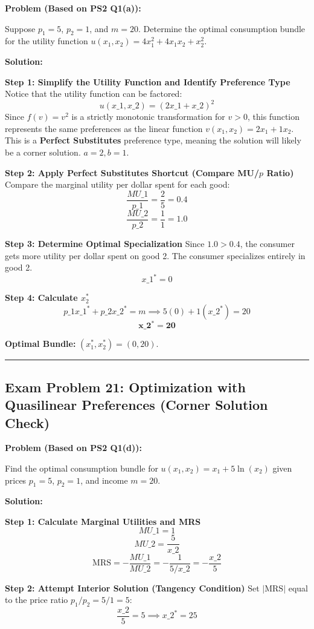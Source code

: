 \documentclass{article}
\begin{document}
\textbf{Problem (Based on PS2 Q1(a)):}

Suppose $p_1 = 5$, $p_2 = 1$, and $m = 20$. Determine the optimal consumption bundle for the utility function $u(x_1, x_2) = 4x_1^2 + 4x_1x_2 + x_2^2$.

\textbf{Solution:}

\textbf{Step 1: Simplify the Utility Function and Identify Preference Type}
Notice that the utility function can be factored:
\[ u(x\_1, x\_2) = (2x\_1 + x\_2)^2 \]
Since $f(v) = v^2$ is a strictly monotonic transformation for $v > 0$, this function represents the same preferences as the linear function $v(x_1, x_2) = 2x_1 + 1x_2$. This is a \textbf{Perfect Substitutes} preference type, meaning the solution will likely be a corner solution. $a=2, b=1$.

\textbf{Step 2: Apply Perfect Substitutes Shortcut (Compare MU/$p$ Ratio)}
Compare the marginal utility per dollar spent for each good:
\[ \frac{MU\_1}{p\_1} = \frac{2}{5} = 0.4 \]
\[ \frac{MU\_2}{p\_2} = \frac{1}{1} = 1.0 \]

\textbf{Step 3: Determine Optimal Specialization}
Since $1.0 > 0.4$, the consumer gets more utility per dollar spent on good 2. The consumer specializes entirely in good 2.
\[ x\_1^* = 0 \]

\textbf{Step 4: Calculate $x_2^*$}
\[ p\_1 x\_1^* + p\_2 x\_2^* = m \implies 5(0) + 1(x\_2^*) = 20 \]
\[ \boldsymbol{x\_2^* = 20} \]

\textbf{Optimal Bundle:} $(x_1^*, x_2^*) = (0, 20)$.

\bigskip\noindent\rule{\linewidth}{0.4pt}\bigskip

\subsection*{\textbf{Exam Problem 21: Optimization with Quasilinear Preferences (Corner Solution Check)}}

\textbf{Problem (Based on PS2 Q1(d)):}

Find the optimal consumption bundle for $u(x_1, x_2) = x_1 + 5 \ln(x_2)$ given prices $p_1=5$, $p_2=1$, and income $m=20$.

\textbf{Solution:}

\textbf{Step 1: Calculate Marginal Utilities and MRS}
\[ MU\_1 = 1 \]
\[ MU\_2 = \frac{5}{x\_2} \]
\[ \text{MRS} = -\frac{MU\_1}{MU\_2} = -\frac{1}{5/x\_2} = -\frac{x\_2}{5} \]

\textbf{Step 2: Attempt Interior Solution (Tangency Condition)}
Set $|\text{MRS}|$ equal to the price ratio $p_1/p_2 = 5/1 = 5$:
\[ \frac{x\_2}{5} = 5 \implies x\_2^* = 25 \]
\end{document}
